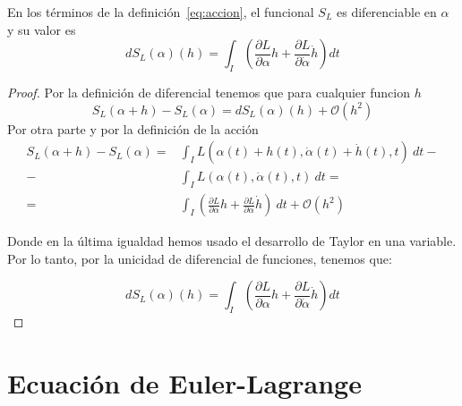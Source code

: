 \begin{proposition}
	En los términos de la definición~\eqref{eq:accion}, el funcional $S_L$ es diferenciable en $\alpha$ y su valor es
	\begin{equation}
		\label{eq:accion_diferencial}
		dS_L(\alpha)(h)=\int_{I}\left( \frac{\partial L}{\partial\alpha}h+\frac{\partial L}{\partial\dot{\alpha}}\dot{h}\right) dt
	\end{equation}
\end{proposition}
\begin{proof}
	Por la definición de diferencial tenemos que para cualquier funcion $h$
	\begin{equation*}
			S_L(\alpha + h) -  S_L(\alpha) = dS_L(\alpha)(h) +\mathcal{O}(h^2)
	\end{equation*}
	Por otra parte y por la definición de la acción
	\begin{equation*}
		\begin{split}
			S_L(\alpha + h) -  S_L(\alpha) = & \int_{I}L(\alpha(t)+h(t), \dot{\alpha}(t)+\dot{h}(t), t)\ dt - \\
			- & \int_{I}L(\alpha(t), \dot{\alpha}(t), t)\ dt =\\
			=& \int_{I}\left( \frac{\partial L}{\partial\alpha}h+\frac{\partial L}{\partial\dot{\alpha}}\dot{h}\right)\ dt+\mathcal{O}(h^2)
		\end{split}
	\end{equation*}

	Donde en la última igualdad hemos usado el desarrollo de Taylor en una variable.
	Por lo tanto, por la unicidad de diferencial de funciones, tenemos que:

	\begin{equation*}
			dS_L(\alpha)(h) =\int_{I}\left( \frac{\partial L}{\partial\alpha}h+\frac{\partial L}{\partial\dot{\alpha}}\dot{h}\right) dt
	\end{equation*}

\end{proof}

\section{Ecuación de Euler-Lagrange}\label{sec:ecuacion-de-euler-lagrange}


